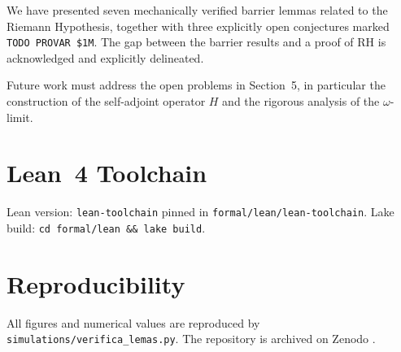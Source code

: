 \documentclass[12pt]{article}
\theoremstyle{plain}
\theoremstyle{definition}
\begin{document}
We have presented seven mechanically verified barrier lemmas related to
the Riemann Hypothesis, together with three explicitly open conjectures
marked \texttt{TODO PROVAR \$1M}.  The gap between the barrier results
and a proof of RH is acknowledged and explicitly delineated.

Future work must address the open problems in Section~5, in particular
the construction of the self-adjoint operator $H$ and the rigorous
analysis of the $\omega$-limit.

\appendix
\section{Lean~4 Toolchain}

Lean version: \texttt{lean-toolchain} pinned in
\texttt{formal/lean/lean-toolchain}.  Lake build:
\texttt{cd formal/lean \&\& lake build}.

\section{Reproducibility}

All figures and numerical values are reproduced by
\texttt{simulations/verifica\_lemas.py}.  The repository is archived
on Zenodo \cite{FTM2026}.
\end{document}
